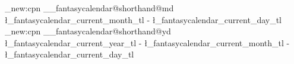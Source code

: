 %

\cs_new:cpn { __fantasycalendar@shorthand@md}
  {
    \l_fantasycalendar_current_month_tl - \l_fantasycalendar_current_day_tl
  }
\cs_new:cpn { __fantasycalendar@shorthand@yd}
  {
    \l_fantasycalendar_current_year_tl -
    \l_fantasycalendar_current_month_tl - \l_fantasycalendar_current_day_tl
  }














%
%
%
%
